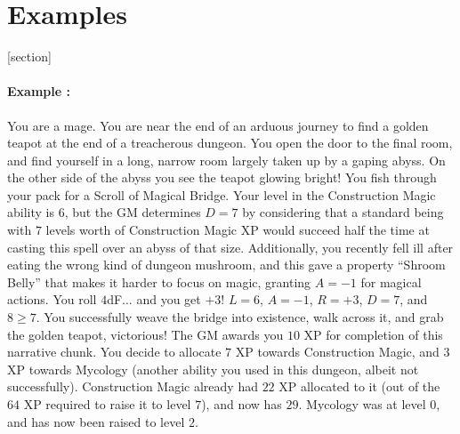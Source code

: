 \section{Examples}

[section]
\newenvironment{example}{\paragraph{Example \theexample:}}{}

\begin{example}
You are a mage. You are near the end of an arduous journey to find a golden teapot at the end of a treacherous dungeon.
You open the door to the final room, and find yourself in a long, narrow room largely taken up by a gaping abyss.
On the other side of the abyss you see the teapot glowing bright!
You fish through your pack for a Scroll of Magical Bridge.
Your level in the Construction Magic ability is $6$,
but the GM determines
$D = 7$
by considering that a standard being with $7$ levels worth of Construction Magic XP would succeed half the time at casting this spell over an abyss of that size.
Additionally, you recently fell ill after eating the wrong kind of dungeon mushroom,
and this gave a property ``Shroom Belly'' that makes it harder to focus on magic,
granting $A = -1$ for magical actions.
You roll $4$dF... and you get $+3$!
$L = 6$, $A = -1$, $R = +3$, $D = 7$, and $8 \geq 7$.
You successfully weave the bridge into existence, walk across it, and grab the golden teapot, victorious!
The GM awards you $10$ XP for completion of this narrative chunk.
You decide to allocate $7$ XP towards Construction Magic, and $3$ XP towards Mycology (another ability you used in this dungeon, albeit not successfully).
Construction Magic already had $22$ XP allocated to it (out of the $64$ XP required to raise it to level $7$), and now has $29$.
Mycology was at level $0$, and has now been raised to level $2$.
\end{example}


